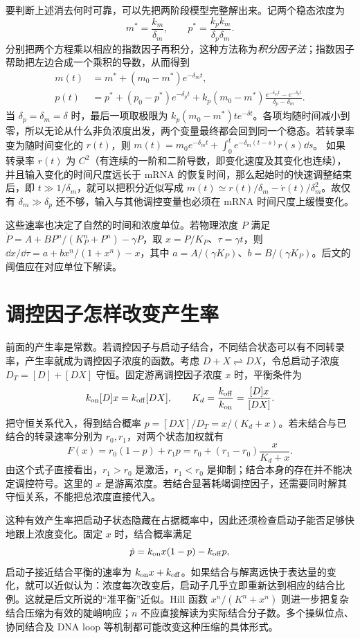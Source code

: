 要判断上述消去何时可靠，可以先把两阶段模型完整解出来。记两个稳态浓度为
\[
m^*=\frac{k_m}{\delta_m},\qquad p^*=\frac{k_pk_m}{\delta_p\delta_m}.
\]
分别把两个方程乘以相应的指数因子再积分，这种方法称为\emph{积分因子法}；指数因子帮助把左边合成一个乘积的导数，从而得到
\begin{align}
m(t)&=m^*+(m_0-m^*)e^{-\delta_mt},\\
p(t)&=p^*+(p_0-p^*)e^{-\delta_pt}
 +k_p(m_0-m^*)\frac{e^{-\delta_mt}-e^{-\delta_pt}}{\delta_p-\delta_m}.
\end{align}
当 $\delta_p=\delta_m=\delta$ 时，最后一项取极限为 $k_p(m_0-m^*)te^{-\delta t}$。各项均随时间减小到零，所以无论从什么非负浓度出发，两个变量最终都会回到同一个稳态。若转录率变为随时间变化的 $r(t)$，则
$m(t)=m_0e^{-\delta_mt}+\int_0^t e^{-\delta_m(t-s)}r(s)\dd s$。
如果转录率 $r(t)$ 为 $C^2$（有连续的一阶和二阶导数，即变化速度及其变化也连续），并且输入变化的时间尺度远长于 mRNA 的恢复时间，那么起始时的快速调整结束后，即 $t\gg1/\delta_m$，就可以把积分近似写成
$m(t)\simeq r(t)/\delta_m-\dot r(t)/\delta_m^2$。故仅有 $\delta_m\gg\delta_p$ 还不够，输入与其他调控变量也必须在 mRNA 时间尺度上缓慢变化。

这些速率也决定了自然的时间和浓度单位。若物理浓度 $P$ 满足 $\dot P=A+B P^n/(K_P^n+P^n)-\gamma P$，取 $x=P/K_P$、$\tau=\gamma t$，则
$\dd x/\dd\tau=a+b x^n/(1+x^n)-x$，其中 $a=A/(\gamma K_P)$、$b=B/(\gamma K_P)$。后文的阈值应在对应单位下解读。

\section{调控因子怎样改变产生率}
前面的产生率是常数。若调控因子与启动子结合，不同结合状态可以有不同转录率，产生率就成为调控因子浓度的函数。考虑 $D+X\rightleftharpoons DX$，令总启动子浓度 $D_T=[D]+[DX]$ 守恒。固定游离调控因子浓度 $x$ 时，平衡条件为
\[
k_{\rm on}[D]x=k_{\rm off}[DX],\qquad K_d=\frac{k_{\rm off}}{k_{\rm on}}=\frac{[D]x}{[DX]}.
\]
把守恒关系代入，得到结合概率 $p=[DX]/D_T=x/(K_d+x)$。若未结合与已结合的转录速率分别为 $r_0,r_1$，对两个状态加权就有
\begin{equation}F(x)=r_0(1-p)+r_1p=r_0+(r_1-r_0)\frac{x}{K_d+x}.\label{eq:occupancy}\end{equation}
由这个式子直接看出，$r_1>r_0$ 是激活，$r_1<r_0$ 是抑制；结合本身的存在并不能决定调控符号。这里的 $x$ 是游离浓度。若结合显著耗竭调控因子，还需要同时解其守恒关系，不能把总浓度直接代入。

这种有效产生率把启动子状态隐藏在占据概率中，因此还须检查启动子能否足够快地跟上浓度变化。固定 $x$ 时，结合概率满足
\[
\dot p=k_{\rm on}x(1-p)-k_{\rm off}p,
\]
启动子接近结合平衡的速率为 $k_{\rm on}x+k_{\rm off}$。如果结合与解离远快于表达量的变化，就可以近似认为：浓度每次改变后，启动子几乎立即重新达到相应的结合比例。这就是后文所说的“准平衡”近似。Hill 函数 $x^n/(K^n+x^n)$ 则进一步把复杂结合压缩为有效的陡峭响应；$n$ 不应直接解读为实际结合分子数。多个操纵位点、协同结合及 DNA loop 等机制都可能改变这种压缩的具体形式。

